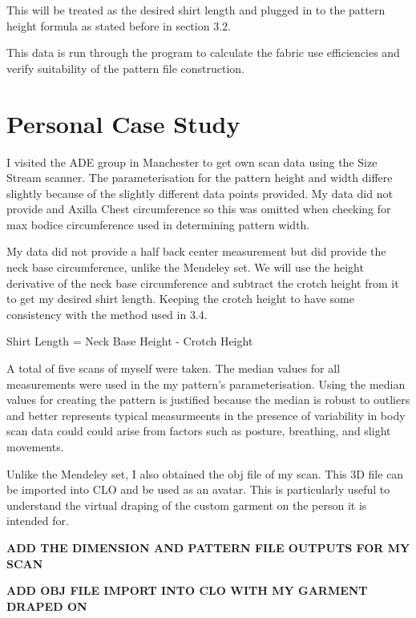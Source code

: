 This will be treated as the desired shirt length and plugged in to the pattern height formula as stated before in section 3.2. 

This data is run through the program to calculate the fabric use efficiencies and verify suitability of the pattern file construction.

\section{Personal Case Study}
I visited the ADE group in Manchester to get own scan data using the Size Stream scanner. The parameterisation for the pattern height and width differe slightly because of the slightly different data points provided. 
My data did not provide and Axilla Chest circumference so this was omitted when checking for max bodice circumference used in determining pattern width.

My data did not provide a half back center measurement but did provide the neck base circumference, unlike the Mendeley set. We will use the height derivative of the neck base circumference and subtract the crotch height from it to get my desired shirt length. Keeping the crotch height to have some consistency with the method used in 3.4.

Shirt Length = Neck Base Height - Crotch Height

A total of five scans of myself were taken. The median values for all measurements were used in the my pattern's parameterisation. Using the median values for creating the pattern is justified because the median is robust to outliers and better represents typical measurmeents in the presence of variability in body scan data could could arise from factors such as posture, breathing, and slight movements.

Unlike the Mendeley set, I also obtained the obj file of my scan. This 3D file can be imported into CLO and be used as an avatar. This is particularly useful to understand the virtual draping of the custom garment on the person it is intended for.

\textbf{ADD THE DIMENSION AND PATTERN FILE OUTPUTS FOR MY SCAN}

\textbf{ADD OBJ FILE IMPORT INTO CLO WITH MY GARMENT DRAPED ON}